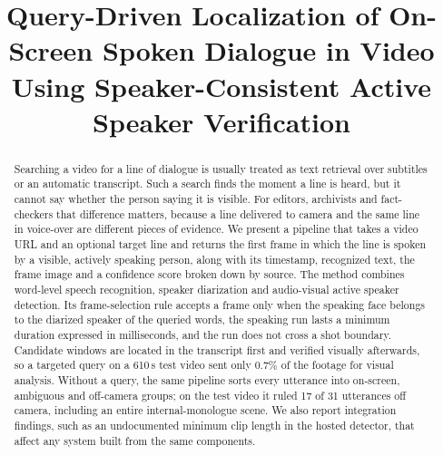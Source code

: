 \documentclass[conference]{IEEEtran}
\begin{document}
\title{Query-Driven Localization of On-Screen Spoken Dialogue in Video Using Speaker-Consistent Active Speaker Verification}

\author{
\and
{}
}

\maketitle

\begin{abstract}
Searching a video for a line of dialogue is usually treated as text retrieval over subtitles or an automatic transcript. Such a search finds the moment a line is heard, but it cannot say whether the person saying it is visible. For editors, archivists and fact-checkers that difference matters, because a line delivered to camera and the same line in voice-over are different pieces of evidence. We present a pipeline that takes a video URL and an optional target line and returns the first frame in which the line is spoken by a visible, actively speaking person, along with its timestamp, recognized text, the frame image and a confidence score broken down by source. The method combines word-level speech recognition, speaker diarization and audio-visual active speaker detection. Its frame-selection rule accepts a frame only when the speaking face belongs to the diarized speaker of the queried words, the speaking run lasts a minimum duration expressed in milliseconds, and the run does not cross a shot boundary. Candidate windows are located in the transcript first and verified visually afterwards, so a targeted query on a 610\,s test video sent only 0.7\% of the footage for visual analysis. Without a query, the same pipeline sorts every utterance into on-screen, ambiguous and off-camera groups; on the test video it ruled 17 of 31 utterances off camera, including an entire internal-monologue scene. We also report integration findings, such as an undocumented minimum clip length in the hosted detector, that affect any system built from the same components.
\end{abstract}
\end{document}
